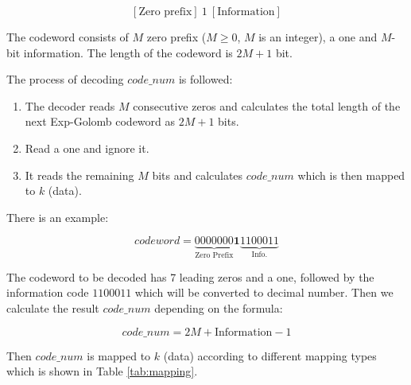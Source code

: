 \documentclass[../main.tex]{subfiles}
\begin{document}
\[ [\text{Zero prefix}]\ 1\ [\text{Information}] \]

The codeword consists of $M$ zero prefix ($M \geq 0$, $M$ is an integer), a one and $M$-bit information. The length of the codeword is $2M+1$ bit.

The process of decoding $code\_num$ is followed: 

\begin{enumerate}
\item The decoder reads $M$ consecutive zeros and calculates the total length of the next Exp-Golomb codeword as $2M + 1$ bits. 
\item Read a one and ignore it.
\item It reads the remaining $M$ bits and calculates $code\_num$ which is then mapped to $k$ (data).
\end{enumerate}

There is an example:

\[ codeword = \underbrace{0000000}_\text{Zero Prefix} \textbf{1} \underbrace{1100011}_\text{Info.}  \]


The codeword to be decoded has 7 leading zeros and a one, followed by the information code $1100011$ which will be converted to decimal number. Then we calculate the result $code\_num$ depending on the formula: 

\[ code\_num = 2M + \text{Information} - 1 \]

Then $code\_num$ is mapped to $k$ (data) according to different mapping types which is shown in Table \ref{tab:mapping}.

\end{document}
